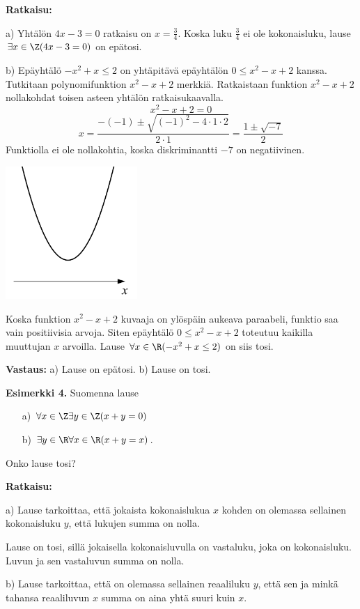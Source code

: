 {\bf Ratkaisu:}

a) Yhtälön $4x - 3 = 0$ ratkaisu on $x = \frac{3}{4}$. Koska luku $\frac{3}{4}$ ei ole kokonaisluku, lause $\exists x\in \Z(4x - 3 = 0)$ on epätosi.

b) Epäyhtälö $-x^2+x \le 2$ on yhtäpitävä epäyhtälön $0 \le x^2 - x + 2$ kanssa. Tutkitaan polynomifunktion $x^2 - x + 2$ merkkiä. Ratkaistaan funktion $x^2 - x + 2$ nollakohdat toisen asteen yhtälön ratkaisukaavalla.
\[
x^2 - x + 2 = 0
\]
\[
x=\frac{-(-1) \pm \sqrt{(-1)^2 -4\cdot 1 \cdot 2}}{2 \cdot 1}=\frac{1 \pm \sqrt{-7}}{2}
\]
Funktiolla ei ole nollakohtia, koska diskriminantti $-7$ on negatiivinen. 

\begin{center}
\includegraphics[width=5cm]{kuvat/kpl3_3_paraabeli}
\end{center}

Koska funktion $x^2 - x + 2$ kuvaaja on ylöspäin aukeava paraabeli, funktio saa vain positiivisia arvoja. Siten epäyhtälö $0 \le x^2 - x + 2$ toteutuu kaikilla muuttujan $x$ arvoilla. Lause $\forall x\in \R(-x^2 + x \le 2)$ on siis tosi.

{\bf Vastaus:} a) Lause on epätosi. b) Lause on tosi.

{\bf Esimerkki 4.}
Suomenna lause
\begin{itemize}
\item[a)] $\forall x\in \Z\exists y\in \Z (x+y=0)$
\item[b)] $\exists y\in \R\forall x\in \R (x+y =x)$.
\end{itemize}
Onko lause tosi?

{\bf Ratkaisu:}

a) Lause tarkoittaa, että jokaista kokonaislukua $x$ kohden on
olemassa sellainen kokonaisluku $y$, että lukujen summa on nolla.

Lause on tosi, sillä jokaisella kokonaisluvulla on vastaluku,
joka on kokonaisluku. Luvun ja sen vastaluvun summa on nolla.

b) Lause tarkoittaa, että on olemassa sellainen reaaliluku $y$,
että sen ja minkä tahansa reaaliluvun $x$ summa on aina yhtä
suuri kuin $x$.

